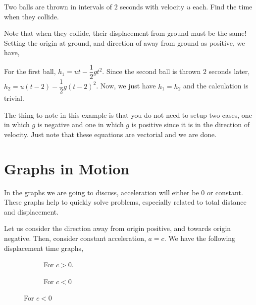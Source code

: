 \begin{example}
    Two balls are thrown in intervals of \(2\) seconds with velocity \(u\) each. Find the
    time when they collide.
    \begin{soln}
        Note that when they collide, their displacement from ground must be the same! Setting 
        the origin at ground, and direction of away from ground as positive, we have,
        
        For the first ball, \(h_{1} = ut - \dfrac{1}{2}gt^2\). Since the second ball
        is thrown \(2\) seconds later, \(h_{2} = u(t-2) - \dfrac{1}{2}g(t-2)^2\). Now, we just have
        \(h_{1} = h_{2}\) and the calculation is trivial.
    \end{soln}
\end{example}

The thing to note in this example is that you do not need to setup two cases, one in which
\(g\) is negative and one in which \(g\) is positive since it is in the direction of velocity. 
Just note that these equations are vectorial and we are done.

\section{Graphs in Motion}

In the graphs we are going to discuss, acceleration will either be \(0\) or constant.
These graphs help to quickly solve problems, especially related to total distance and 
displacement. 

Let us consider the direction away from origin positive, and towards origin negative.
Then, consider constant acceleration, \(a = c\). We have the following displacement time
graphs,

\begin{figure}[H]
    \centering
    \begin{subfigure}{0.5\textwidth}
        \centering
        \caption{For \(c > 0\). }
    \end{subfigure}%
    \begin{subfigure}{0.5\textwidth}
        \centering
        \caption{For \(c < 0\)}
    \end{subfigure}%
\end{figure}

